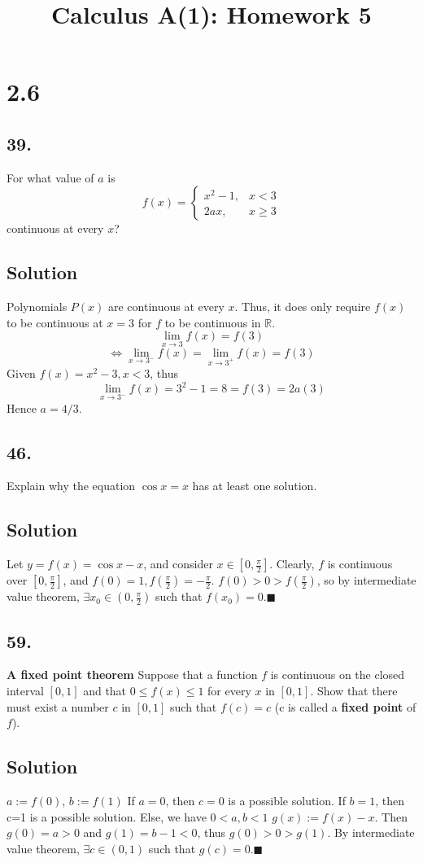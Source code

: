 \documentclass{article}
\title{Calculus A(1): Homework 5}
\begin{document}
\maketitle
\section*{2.6}
\subsection*{39.}
For what value of $a$ is 
\[f(x)=\left\{\begin{array}{ll}
x^2-1, & x<3 \\
2ax,   & x\geq 3
\end{array}\right.\]
continuous at every $x$?
\subsection*{Solution}
Polynomials $P(x)$ are continuous at every $x$. Thus, it does only require $f(x)$ to be continuous at $x=3$ for $f$ to be continuous in $\mathbb{R}$.
\[\lim _{x\to 3} f(x) =f(3)\]
\[\Leftrightarrow \lim _{x\to 3^-}f(x)=\lim _{x\to 3^+}f(x)=f(3)\]
Given $f(x)=x^2-3,x<3$, thus
\[\lim _{x\to 3^-} f(x)=3^2-1=8=f(3)=2a(3)\]
Hence $a=4/3$.
\subsection*{46.}
Explain why the equation $\cos{x}=x$ has at least one solution.
\subsection*{Solution}
Let $y=f(x)=\cos{x}-x$, and consider $x\in [0,\frac{\pi}{2}]$.\newline
Clearly, $f$ is continuous over $[0,\frac{\pi}{2}]$, and $f(0)=1,f(\frac{\pi}{2})=-\frac{\pi}{2}$. \newline
$f(0)>0>f(\frac{\pi}{2})$, so by intermediate value theorem, $\exists x_0\in (0,\frac{\pi}{2})$ such that $f(x_0)=0.\blacksquare$
\subsection*{59.}
\textbf{A fixed point theorem} Suppose that a function $f$ is continuous on the closed interval $[0,1]$ and that $0\leq f(x) \leq 1$ for every $x$ in $[0,1]$. Show that there must exist a number $c$ in $[0,1]$ such that $f(c)=c$ (c is called a \textbf{fixed point} of $f$).
\subsection*{Solution}
$a:=f(0)$, $b:=f(1)$\newline
If $a=0$, then $c=0$ is a possible solution. If $b=1$, then c=1 is a possible solution.\newline
Else, we have $0<a,b<1$\newline
$g(x):=f(x)-x$. Then $g(0)=a>0$ and $g(1)=b-1<0$, thus $g(0)>0>g(1)$. By intermediate value theorem, $\exists c \in (0,1)$ such that $g(c)=0.\blacksquare$
\end{document}
